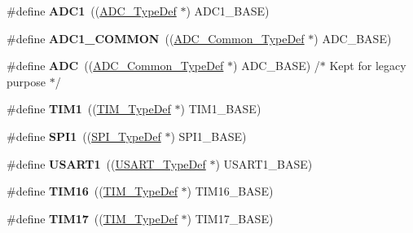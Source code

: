 \begin{DoxyCompactItemize}
\#define {\bfseries A\+D\+C1}~((\hyperlink{struct_a_d_c___type_def}{A\+D\+C\+\_\+\+Type\+Def} $\ast$) A\+D\+C1\+\_\+\+B\+A\+SE)
\item 
\mbox{\label{group___peripheral__declaration_gaf1919c64fc774aab31190346fd5457e2}} 
\#define {\bfseries A\+D\+C1\+\_\+\+C\+O\+M\+M\+ON}~((\hyperlink{struct_a_d_c___common___type_def}{A\+D\+C\+\_\+\+Common\+\_\+\+Type\+Def} $\ast$) A\+D\+C\+\_\+\+B\+A\+SE)
\item 
\mbox{\label{group___peripheral__declaration_ga54d148b91f3d356713f7e367a2243bea}} 
\#define {\bfseries A\+DC}~((\hyperlink{struct_a_d_c___common___type_def}{A\+D\+C\+\_\+\+Common\+\_\+\+Type\+Def} $\ast$) A\+D\+C\+\_\+\+B\+A\+SE) /$\ast$ Kept for legacy purpose $\ast$/
\item 
\mbox{\label{group___peripheral__declaration_ga2e87451fea8dc9380056d3cfc5ed81fb}} 
\#define {\bfseries T\+I\+M1}~((\hyperlink{struct_t_i_m___type_def}{T\+I\+M\+\_\+\+Type\+Def} $\ast$) T\+I\+M1\+\_\+\+B\+A\+SE)
\item 
\mbox{\label{group___peripheral__declaration_gad483be344a28ac800be8f03654a9612f}} 
\#define {\bfseries S\+P\+I1}~((\hyperlink{struct_s_p_i___type_def}{S\+P\+I\+\_\+\+Type\+Def} $\ast$) S\+P\+I1\+\_\+\+B\+A\+SE)
\item 
\mbox{\label{group___peripheral__declaration_ga92871691058ff7ccffd7635930cb08da}} 
\#define {\bfseries U\+S\+A\+R\+T1}~((\hyperlink{struct_u_s_a_r_t___type_def}{U\+S\+A\+R\+T\+\_\+\+Type\+Def} $\ast$) U\+S\+A\+R\+T1\+\_\+\+B\+A\+SE)
\item 
\mbox{\label{group___peripheral__declaration_ga73ec606e7dacf17e18c661e8ff8c7c8d}} 
\#define {\bfseries T\+I\+M16}~((\hyperlink{struct_t_i_m___type_def}{T\+I\+M\+\_\+\+Type\+Def} $\ast$) T\+I\+M16\+\_\+\+B\+A\+SE)
\item 
\mbox{\label{group___peripheral__declaration_ga65aea6c8b36439e44ad6cde0e6891aab}} 
\#define {\bfseries T\+I\+M17}~((\hyperlink{struct_t_i_m___type_def}{T\+I\+M\+\_\+\+Type\+Def} $\ast$) T\+I\+M17\+\_\+\+B\+A\+SE)

\end{DoxyCompactItemize}
